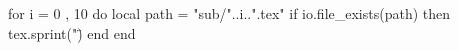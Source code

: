 \documentclass[10pt]{beamer}
\title{}
\institute{}
\author{}
\date{\today}
\begin{document}
\begin{luacode*}
    for i = 0 , 10 do
        local path = "sub/"..i..".tex"
        if io.file_exists(path) then
            tex.sprint("\")
        end
    end
\end{luacode*}


\end{document}
